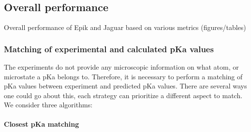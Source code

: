\documentclass[9pt,lineno,final]{elife}
\begin{document}
\subsection{Overall performance}


Overall performance of Epik and Jaguar based on various metrics (figures/tables)
\subsubsection {Matching of experimental and calculated pKa values}


The experiments do not provide any microscopic information on what atom, or microstate a pKa belongs to.
%
Therefore, it is necessary to perform a matching of pKa values between experiment and predicted pKa values.
%
There are several ways one could go about this, each strategy can prioritize a different aspect to match.
%
We consider three algorithms:
\paragraph{Closest pKa matching}
%
\end{document}
